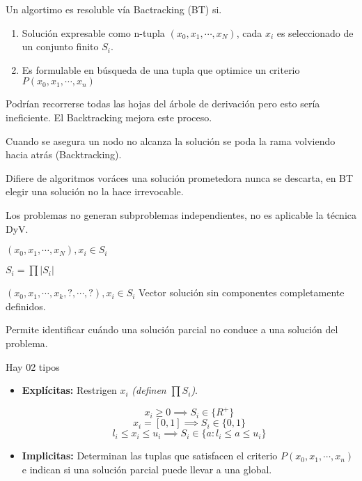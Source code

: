 \documentclass[tikz,11pt,fleqn]{book} %
\begin{document}
\begin{theorem}[Caracterización]
    Un algortimo es resoluble vía Bactracking (BT) si.
    \begin{enumerate}
        \item Solución expresable como n-tupla $(x_0, x_1, \cdots,x_N)$, cada $x_i$ es seleccionado de un conjunto finito $S_i$.
        \item Es formulable en búsqueda de una tupla que optimice un criterio $P(x_0, x_1, \cdots,x_n)$ 
    \end{enumerate}
    Podrían recorrerse todas las hojas del árbole de derivación pero esto sería ineficiente. El Backtracking mejora este proceso.

    Cuando se asegura un nodo no alcanza la solución se poda la rama volviendo hacia atrás (Backtracking).

    Difiere de algoritmos voráces una solución prometedora nunca se descarta, en BT elegir una solución no la hace irrevocable.

    Los problemas no generan subproblemas independientes, no es aplicable la técnica DyV.
\end{theorem}

\begin{definition}[Solución]
$(x_0, x_1, \cdots,x_N),x_i\in S_i$\end{definition}

\begin{definition}
$S_i=\prod|S_i|$\end{definition}

\begin{definition}
$(x_0, x_1, \cdots,x_k,?,\cdots,?),x_i\in S_i$
Vector solución sin componentes completamente definidos. 
\end{definition}

\begin{definition}
Permite identificar cuándo una solución parcial no conduce a una solución del problema. 
\end{definition}

\begin{definition}
Hay 02 tipos
\begin{itemize}
    \item \textbf{Explícitas:} Restrigen $x_i$ \textit{(definen $\prod S_i$)}.
    \begin{example}
        $$ x_i\ge0\implies S_i\in \{R^+\} $$
        $$ x_i=[0,1]\implies S_i\in \{0,1\} $$
        $$ l_i\le x_i\le u_i\implies S_i\in\{a:l_i\le a\le u_i\} $$
    \end{example}
    \item \textbf{Implicitas:} Determinan las tuplas que satisfacen el criterio $P(x_0,x_1,\cdots,x_n)$ e indican si una solución parcial puede llevar a una global.
\end{itemize}
\end{definition}
\end{document}
